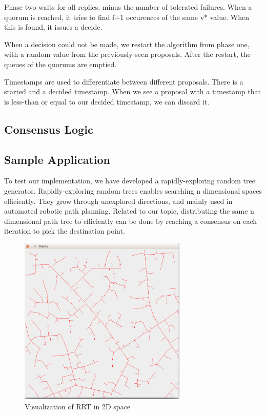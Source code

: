 \documentclass[times, 12pt,twocolumn]{article}
\begin{document}
Phase two waits for all replies, minus the number of tolerated failures. 
When a quorum is reached, it tries to find f+1 occurences of the same v* value. 
When this is found, it issues a decide.

When a decision could not be made, we restart the algorithm from phase one, with 
a random value from the previously seen proposals. After the restart, the 
queues of the quorums are emptied.

Timestamps are used to differentiate between different proposals. There is a started 
and a decided timestamp. When we see a proposal with a timestamp that is less-than 
or equal to our decided timestamp, we can discard it.



\subsection{Consensus Logic}

\subsection{Sample Application}

To test our implementation, we have developed a rapidly-exploring random tree generator. Rapidly-exploring random trees\cite{Lavalle98rapidly-exploringrandom} enables searching n dimensional spaces efficiently. They grow through unexplored directions, and mainly used in automated robotic path planning. Related to our topic, distributing the same n dimensional path tree to efficiently can be done by reaching a consensus on each iteration to pick the destination point.


\begin{figure}[ht!]
\centering
\includegraphics[width=80mm]{rrt.png}
\caption{Visualization of RRT in 2D space}
\label{fig:rrt}
\end{figure}
\end{document}
